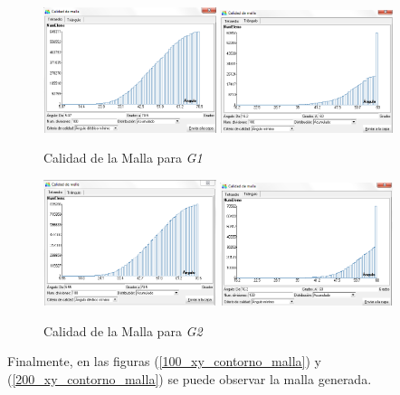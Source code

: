 \documentclass[10pt,a4paper,final]{article}
\begin{document}
\begin{figure}[htbp] 
\centering 
\includegraphics[width=0.45\textwidth]{img/100m/100_calidad_malla_tetraedros} 
\includegraphics[width=0.45\textwidth]{img/100m/100_calidad_malla_triangulos}
\caption{Calidad de la Malla para \emph{G1}} 
\label{calidad_malla_g1} 
\end{figure} 
%
%
\begin{figure}[htbp] 
\centering 
\includegraphics[width=0.45\textwidth]{img/200m/200_calidad_malla_tetraedros} 
\includegraphics[width=0.45\textwidth]{img/200m/200_calidad_malla_triangulos}
\caption{Calidad de la Malla para \emph{G2}} 
\label{calidad_malla_g2} 
\end{figure} 
%
Finalmente, en las figuras (\ref{100_xy_contorno_malla}) y (\ref{200_xy_contorno_malla}) se puede observar la malla generada.
\end{document}
